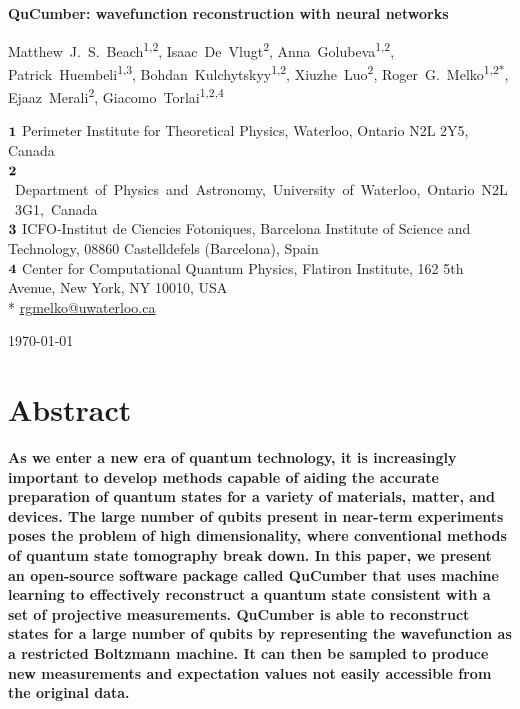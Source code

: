 \documentclass[submission, Phys, hidelnks]{SciPost}
\begin{document}
\begin{center}{\Large \textbf{
    QuCumber: wavefunction reconstruction with neural networks
}}\end{center}

\begin{center}
    Matthew~J.~S.~Beach\textsuperscript{1,2},
    Isaac~De~Vlugt\textsuperscript{2},
    Anna~Golubeva\textsuperscript{1,2},
    Patrick~Huembeli\textsuperscript{1,3},
    Bohdan~Kulchytskyy\textsuperscript{1,2},
    Xiuzhe~Luo\textsuperscript{2},
    Roger~G.~Melko\textsuperscript{1,2*},
    Ejaaz~Merali\textsuperscript{2},
    Giacomo~Torlai\textsuperscript{1,2,4}
\end{center}

\begin{center}
    ${\bf 1}$ Perimeter Institute for Theoretical Physics, Waterloo,
    Ontario N2L 2Y5, Canada
    \\
    \mbox{${\bf 2}$ Department of Physics and Astronomy, University of Waterloo,
    Ontario N2L 3G1, Canada}
    \\
    ${\bf 3}$ ICFO-Institut de Ciencies Fotoniques, Barcelona Institute of Science and Technology,
    08860 Castelldefels (Barcelona), Spain
    \\
    ${\bf 4}$ Center for Computational Quantum Physics, Flatiron Institute,
    162 5th Avenue, New York, NY 10010, USA\\

    * \href{mailto:rgmelko@uwaterloo.ca}{rgmelko@uwaterloo.ca} \\
\end{center}

\begin{center}
    \today
\end{center}


\vspace{-2cm}


\section*{Abstract}
{\bf
As we enter a new era of quantum technology, it is increasingly important to develop methods capable of aiding 
the accurate preparation of quantum states for a variety of materials, matter, and devices.
The large number of qubits present in near-term experiments poses the problem of high dimensionality, where conventional methods of quantum state tomography break down. 
In this paper, we present an open-source software package called QuCumber that uses machine learning to effectively reconstruct a quantum state consistent with a set of projective measurements. 
QuCumber is able to reconstruct states for a large number of qubits by representing the wavefunction as a restricted Boltzmann machine.
It can then be sampled to produce new measurements and expectation values not easily accessible from the original data.
}
\end{document}
